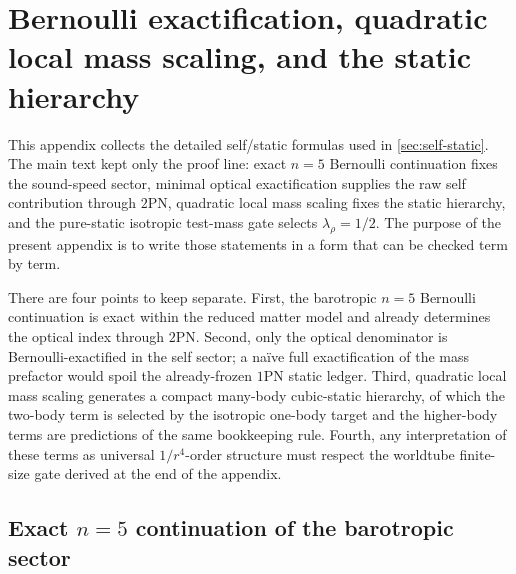 \documentclass[11pt]{article}
\newcommand{\OnePN}{\mathrm{1PN}}
\newcommand{\TwoPN}{\mathrm{2PN}}
\begin{document}
\section{Bernoulli exactification, quadratic local mass scaling, and the static hierarchy}
\label{app:static-scaling}

This appendix collects the detailed self/static formulas used in
\cref{sec:self-static}.  The main text kept only the proof line: exact
\(n=5\) Bernoulli continuation fixes the sound-speed sector, minimal optical
exactification supplies the raw self contribution through \(\TwoPN\), quadratic local
mass scaling fixes the static hierarchy, and the pure-static isotropic test-mass gate
selects
\(\lambda_\rho=1/2\).
The purpose of the present appendix is to write those statements in a form that can be
checked term by term.

There are four points to keep separate.
First, the barotropic \(n=5\) Bernoulli continuation is exact within the reduced matter
model and already determines the optical index through \(\TwoPN\).
Second, only the optical denominator is Bernoulli-exactified in the self sector; a naïve
full exactification of the mass prefactor would spoil the already-frozen \(\OnePN\)
static ledger.
Third, quadratic local mass scaling generates a compact many-body cubic-static hierarchy,
of which the two-body term is selected by the isotropic one-body target and the higher-body
terms are predictions of the same bookkeeping rule.
Fourth, any interpretation of these terms as universal \(1/r^4\)-order structure must
respect the worldtube finite-size gate derived at the end of the appendix.

\subsection{Exact \texorpdfstring{$n=5$}{n=5} continuation of the barotropic sector}
\label{app:static-bernoulli}
\end{document}
